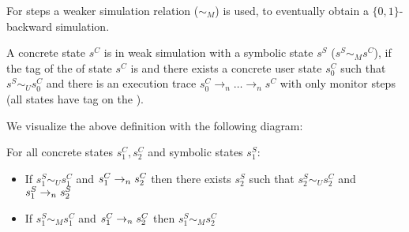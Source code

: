 For \MONITOR steps a weaker simulation relation ($\sim_M$) is used,
to eventually obtain a $\lbrace 0,1 \rbrace$-backward simulation.

\begin{definition}
\label{weak_simulation_relation}
  A concrete state $s^C$ is in weak simulation with a symbolic state $s^S$
  ($s^S \sim_M s^C$), if the tag of the \pc of state $s^C$ is \MONITOR and
  there exists a concrete user state $s_0^C$ such that $s^S \sim_U s^C_0$
  and there is an execution trace $s^C_0 \to_n \ldots \to_n s^C$ with only
  monitor steps (all states have \MONITOR tag on the \pc).
  
  We visualize the above definition with the following diagram:

%
\vspace{-\smallskipamount}
 \begin{center}
  \end{center}
\vspace{-\smallskipamount}
\end{definition}

\begin{theorem}
\label{backward_simulation_CS}
  For all concrete states $s^C_1, s^C_2$ and symbolic states $s^S_1$:
  \begin{itemize}
    \item If $s^S_1 \sim_U s^C_1$ and $s^C_1\to_ns^C_2$ then there exists
      $s^S_2$ such that $s^S_2 \sim_U s^C_2$ and $s^S_1\to_ns^S_2$
    \item If $s^S_1 \sim_M s^C_1$ and $s^C_1\to_ns^C_2$ then
      $s^S_1 \sim_M s^C_2$
    \end{itemize}
\end{theorem}

